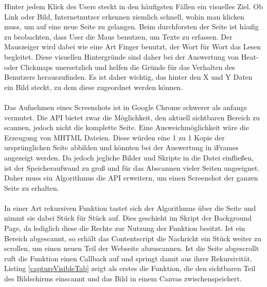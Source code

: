 Hinter jedem Klick des Users steckt in den häufigsten Fällen ein visuelles Ziel. Ob Link oder Bild, Internetnutzer erkennen ziemlich schnell, wohin man klicken muss, um auf eine neue Seite zu gelangen. Beim durchforsten der Seite ist häufig zu beobachten, dass User die Maus benutzen, um Texte zu erfassen. Der Mauszeiger wird dabei wie eine Art Finger benutzt, der Wort für Wort das Lesen begleitet. Diese visuellen Hintergründe sind daher bei der Auswertung von Heat- oder Clickmaps unersetzlich und helfen die Gründe für das Verhalten des Benutzers herauszufinden. Es ist daher wichtig, das hinter den X und Y Daten ein Bild steckt, zu dem diese zugeordnet werden können.\\
\\
Das Aufnehmen eines Screenshots ist in Google Chrome schwerer als anfangs vermutet. Die API bietet zwar die Möglichkeit, den aktuell sichtbaren Bereich zu scannen, jedoch nicht die komplette Seite. Eine Ausweichmöglichkeit wäre die Erzeugung von \Gls{MHTML} Dateien. Diese würden eine 1 zu 1 Kopie der ursprünglichen Seite abbilden und könnten bei der Auswertung in iFrames angezeigt werden. Da jedoch jegliche Bilder und Skripte in die Datei einfließen, ist der Speicheraufwand zu groß und für das Abscannen vieler Seiten ungeeignet. Daher muss ein Algorithmus die API erweitern, um einen Screenshot der ganzen Seite zu erhalten.\\
\\
In einer Art rekursiven Funktion tastet sich der Algorithmus über die Seite und nimmt sie dabei Stück für Stück auf. Dies geschieht im Skript der Background Page, da lediglich diese die Rechte zur Nutzung der Funktion besitzt. Ist ein Bereich abgescannt, so erhält das Contentscript die Nachricht ein Stück weiter zu scrollen, um einen neuen Teil der Webseite abzuscannen. Ist die Seite abgescrollt ruft die Funktion einen Callback auf und springt damit aus ihrer Rekursivität. Listing \ref{captureVisibleTab} zeigt als erstes die Funktion, die den sichtbaren Teil des Bildschirms einscannt und das Bild in einem Canvas zwischenspeichert.
\\
